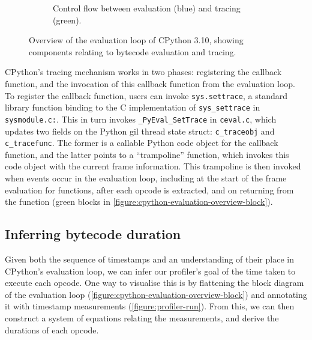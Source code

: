 \begin{figure}[H]
\begin{subfigure}[b]{0.3\textwidth}
       \vspace{1em}
       \caption{Control flow between evaluation (blue) and tracing (green).}
       \label{figure:cpython-evaluation-overview-block}
    \end{subfigure}
    \vspace{2em}
    \captionsetup{name=Listing}
    \caption{Overview of the evaluation loop of CPython 3.10, showing components relating to bytecode evaluation and tracing.}
    \label{figure:cpython-evaluation-overview}
\end{figure}

CPython's tracing mechanism works in two phases: registering the callback function, and the invocation of this callback function from the evaluation loop.
To register the callback function, users can invoke \texttt{sys.settrace}, a standard library function binding to the C implementation of \texttt{sys\_settrace} in \texttt{sysmodule.c:}. This in turn invokes \texttt{\_PyEval\_SetTrace} in \texttt{ceval.c}, which updates two fields on the Python \ac{gil} thread state struct: \texttt{c\_traceobj} and \texttt{c\_tracefunc}. The former is a callable Python code object for the callback function, and the latter points to a ``trampoline'' function, which invokes this code object with the current frame information.
This trampoline is then invoked when events occur in the evaluation loop, including at the start of the frame evaluation for functions, after each opcode is extracted, and on returning from the function (green blocks in \autoref{figure:cpython-evaluation-overview-block}).


\subsection{Inferring bytecode duration}
\label{ssec:profiling-bytecode-inferring-duration}

Given both the sequence of timestamps and an understanding of their place in CPython's evaluation loop, we can infer our profiler's goal of the time taken to execute each opcode.
One way to visualise this is by flattening the block diagram of the evaluation loop (\autoref{figure:cpython-evaluation-overview-block}) and annotating it with timestamp measurements (\autoref{figure:profiler-run}). From this, we can then construct a system of equations relating the measurements, and derive the durations of each opcode.



